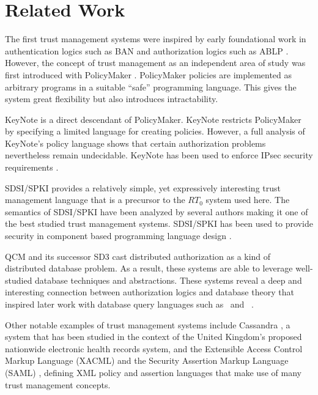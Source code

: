 \section{Related Work}


The first trust management systems were inspired by early foundational work in authentication
logics such as BAN \cite{Burrows:LA} and authorization logics such as ABLP \cite{Abadi:CACDS}.
However, the concept of trust management as an independent area of study was first introduced
with PolicyMaker \cite{Blaze:DTM,Blaze:CCPTMS}. PolicyMaker policies are implemented as
arbitrary programs in a suitable ``safe'' programming language. This gives the system great
flexibility but also introduces intractability.

KeyNote \cite{RFC-2704} is a direct descendant of PolicyMaker. KeyNote restricts PolicyMaker by
specifying a limited language for creating policies. However, a full analysis of KeyNote's
policy language \cite{Li:DCFTML} shows that certain authorization problems nevertheless remain
undecidable. KeyNote has been used to enforce IPsec security requirements
\cite{Blaze:TMIPS,Blaze:EKTMS}.

SDSI/SPKI \cite{Rivest:SDSI-11,RFC-2693} provides a relatively simple, yet expressively
interesting trust management language that is a precursor to the $RT_0$ system used here. The
semantics of SDSI/SPKI have been analyzed by several authors
\cite{Abadi:OSLLNS,Halpern:LSSLLNS,Howell:FSS,Li:LNSS,Clarke:CCDSS} making it one of the best
studied trust management systems. SDSI/SPKI has been used to provide security in component based
programming language design \cite{Liu:CSI}.

QCM \cite{Gunter:DALSI,Gunter:GCR} and its successor SD3 \cite{Jim:STMSCE,Jim:DDQE} cast
distributed authorization as a kind of distributed database problem. As a result, these systems
are able to leverage well-studied database techniques and abstractions. These systems reveal a
deep and interesting connection between authorization logics and database theory that inspired
later work with database query languages such as \datalog\ and \datalogc\ \cite{Li:DCFTML}.

Other notable examples of trust management systems include Cassandra \cite{Becker:CFTMAEHR}, a
system that has been studied in the context of the United Kingdom's proposed nationwide
electronic health records system, and the Extensible Access Control Markup Language (XACML)
\cite{OASIS:XACMLTC} and the Security Assertion Markup Language (SAML) \cite{OASIS:SSTC},
defining XML policy and assertion languages that make use of many trust management concepts.

